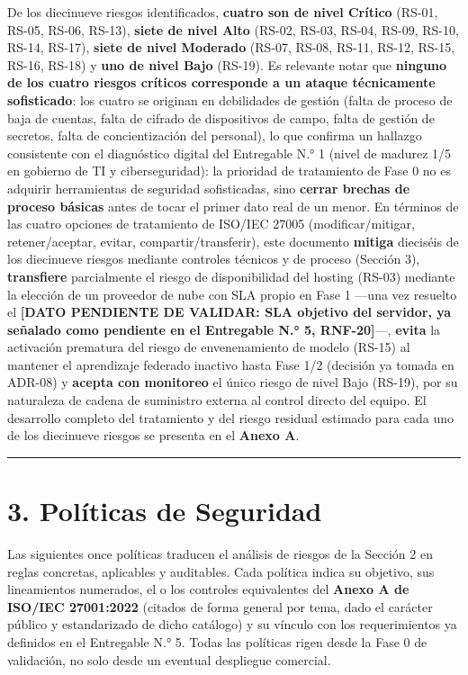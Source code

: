 \documentclass[11pt,a4paper]{article}
\begin{document}
De los diecinueve riesgos identificados, \textbf{cuatro son de nivel Crítico} (RS-01, RS-05, RS-06, RS-13), \textbf{siete de nivel Alto} (RS-02, RS-03, RS-04, RS-09, RS-10, RS-14, RS-17), \textbf{siete de nivel Moderado} (RS-07, RS-08, RS-11, RS-12, RS-15, RS-16, RS-18) y \textbf{uno de nivel Bajo} (RS-19). Es relevante notar que \textbf{ninguno de los cuatro riesgos críticos corresponde a un ataque técnicamente sofisticado}: los cuatro se originan en debilidades de gestión (falta de proceso de baja de cuentas, falta de cifrado de dispositivos de campo, falta de gestión de secretos, falta de concientización del personal), lo que confirma un hallazgo consistente con el diagnóstico digital del Entregable N.° 1 (nivel de madurez 1/5 en gobierno de TI y ciberseguridad): la prioridad de tratamiento de Fase 0 no es adquirir herramientas de seguridad sofisticadas, sino \textbf{cerrar brechas de proceso básicas} antes de tocar el primer dato real de un menor. En términos de las cuatro opciones de tratamiento de ISO/IEC 27005 (modificar/mitigar, retener/aceptar, evitar, compartir/transferir), este documento \textbf{mitiga} dieciséis de los diecinueve riesgos mediante controles técnicos y de proceso (Sección 3), \textbf{transfiere} parcialmente el riesgo de disponibilidad del hosting (RS-03) mediante la elección de un proveedor de nube con SLA propio en Fase 1 ---una vez resuelto el \textbf{{[}DATO PENDIENTE DE VALIDAR: SLA objetivo del servidor, ya señalado como pendiente en el Entregable N.° 5, RNF-20{]}}---, \textbf{evita} la activación prematura del riesgo de envenenamiento de modelo (RS-15) al mantener el aprendizaje federado inactivo hasta Fase 1/2 (decisión ya tomada en ADR-08) y \textbf{acepta con monitoreo} el único riesgo de nivel Bajo (RS-19), por su naturaleza de cadena de suministro externa al control directo del equipo. El desarrollo completo del tratamiento y del riesgo residual estimado para cada uno de los diecinueve riesgos se presenta en el \textbf{Anexo A}.

\begin{center}\rule{0.5\linewidth}{0.5pt}\end{center}

\section{3. Políticas de Seguridad}\label{poluxedticas-de-seguridad}

Las siguientes once políticas traducen el análisis de riesgos de la Sección 2 en reglas concretas, aplicables y auditables. Cada política indica su objetivo, sus lineamientos numerados, el o los controles equivalentes del \textbf{Anexo A de ISO/IEC 27001:2022} (citados de forma general por tema, dado el carácter público y estandarizado de dicho catálogo) y su vínculo con los requerimientos ya definidos en el Entregable N.° 5. Todas las políticas rigen desde la Fase 0 de validación, no solo desde un eventual despliegue comercial.
\end{document}
